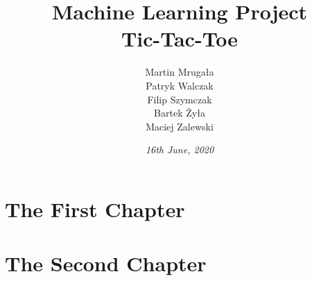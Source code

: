 \documentclass[a4paper,12pt]{book}
\begin{document}
	
	\author{Martin Mrugała\\Patryk Walczak\\Filip Szymczak\\Bartek Żyła\\Maciej Zalewski}
	\title{\Huge{\bf{Machine Learning Project\\Tic-Tac-Toe}}}
	\date{\emph{16th June, 2020}}
	
	\frontmatter
	\maketitle
	\tableofcontents
	
	\mainmatter
	\chapter{The First Chapter}
	\chapter{The Second Chapter}
	
	\backmatter
	
\end{document}
